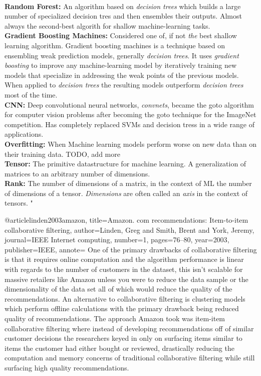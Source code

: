 {  \\ \textbf{Random Forest:} An algorithm based on \emph{decision trees} which builds a large number of specialized decision tres and then ensembles their outputs. Almost always the second-best algorith for shallow machine-learning tasks.
  \\ \textbf{Gradient Boosting Machines:} Considered one of, if not \emph{the} best shallow learning algorithm. Gradient boosting machines is a technique based on ensembling weak prediction models, generally \emph{decision trees}. It uses \emph{gradient boosting} to improve any machine-learning model by iteratively training new models that specialize in addressing the weak points
  of the previous models. When applied to \emph{decision trees} the resulting models outperform \emph{decision trees} most of the time.
  \\ \textbf{CNN:} Deep convolutional neural networks, \emph{convnets}, became the goto algorithm for computer vision problems after becoming the goto technique for the ImageNet competition. Has completely replaced SVMs and decision tress in a wide range of applications.
  \\ \textbf{Overfitting:} When Machine learning models perform worse on new data than on their training data. TODO, add more
  \\ \textbf{Tensor:} The primitive datastructure for machine learning. A generalization of matrices to an arbitrary number of dimensions.
  \\ \textbf{Rank:} The number of dimensions of a matrix, in the context of ML the number of dimensions of a tensor. \emph{Dimensions} are often called an \emph{axis} in the context of tensors.
  "
}

@article{linden2003amazon,
  title={Amazon. com recommendations: Item-to-item collaborative filtering},
  author={Linden, Greg and Smith, Brent and York, Jeremy},
  journal={IEEE Internet computing},
  number={1},
  pages={76--80},
  year={2003},
  publisher={IEEE},
  annote= {One of the primary drawbacks of collaborative filtering is that it requires online computation and the algorithm performance is linear with regards to the number of customers in the dataset, this isn't scalable for massive retailers like Amazon unless you
   were to reduce the data sample or the dimensionality of the data set all of which would reduce the quality of the recommendations. An alternative to collaborative filtering is clustering models which perform offline calculations with the primary drawback being reduced quality
    of recommendations. The approach Amazon took was item-item collaborative filtering where instead of developing recommendations off of similar customer decisions the researchers keyed in only on surfacing items similar to items the customer had either bought or reviewed, drastically 
    reducing the computation and memory concerns of traditional collaborative filtering while still surfacing high quality recommendations.}
}

